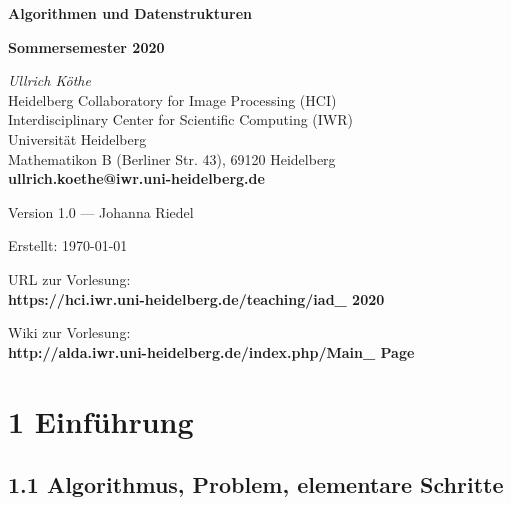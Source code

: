 \documentclass[11pt, fleqn]{scrreprt}
\begin{document}
\thispagestyle{plain}
\begin{titlepage}

    \begin{center}
        {\LARGE\textbf{Algorithmen und Datenstrukturen}} \medskip

        {\LARGE\textbf{Sommersemester 2020}}

        \vspace{3.7cm}

        {\textit{Ullrich Köthe}} \\
        {\small Heidelberg Collaboratory for Image Processing (HCI)}
\\
        {\small Interdisciplinary Center for Scientific Computing (IWR)}
\\
        {\small Universität Heidelberg }\\
        {\small Mathematikon B (Berliner Str. 43), 69120 Heidelberg
} \\
        \textbf{ullrich.koethe@iwr.uni-heidelberg.de}

        \vspace{8cm}

        Version 1.0 --- Johanna Riedel

        \bigskip

        Erstellt: \today

        \bigskip

        URL zur Vorlesung:  \\

        \textbf{https://hci.iwr.uni-heidelberg.de/teaching/iad\_ 2020}

        \bigskip

        Wiki zur Vorlesung: \\

        \textbf{http://alda.iwr.uni-heidelberg.de/index.php/Main\_ Page}



    \end{center}
\end{titlepage}
\restoregeometry

\tableofcontents

\newpage

\chapter*{1 Einführung}

\section*{1.1 Algorithmus, Problem, elementare Schritte}
\end{document}
